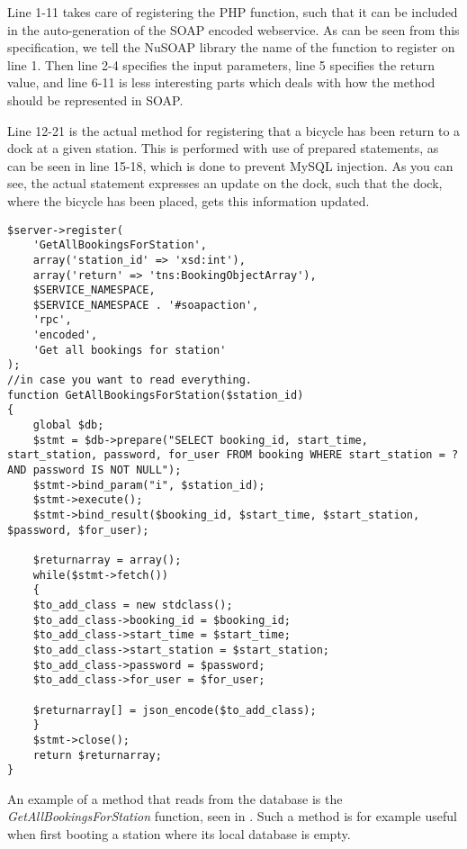 Line 1-11 takes care of registering the PHP function, such that it can be included in the auto-generation of the SOAP encoded webservice.
As can be seen from this specification, we tell the NuSOAP library the name of the function to register on line 1.
Then line 2-4 specifies the input parameters, line 5 specifies the return value, and line 6-11 is less interesting parts which deals with how the method should be represented in SOAP.

Line 12-21 is the actual method for registering that a bicycle has been return to a dock at a given station.
This is performed with use of prepared statements, as can be seen in line 15-18, which is done to prevent MySQL injection.
As you can see, the actual statement expresses an update on the dock, such that the dock, where the bicycle has been placed, gets this information updated.

\begin{minipage}{\textwidth}
\begin{lstlisting}[caption = {Method for reading all bookings for a given station}, label = {lst:getallbookingstation}]
$server->register(
	'GetAllBookingsForStation',
	array('station_id' => 'xsd:int'),
	array('return' => 'tns:BookingObjectArray'),
	$SERVICE_NAMESPACE,
	$SERVICE_NAMESPACE . '#soapaction',
	'rpc',
	'encoded',
	'Get all bookings for station'
);
//in case you want to read everything.
function GetAllBookingsForStation($station_id)
{
	global $db;
	$stmt = $db->prepare("SELECT booking_id, start_time, start_station, password, for_user FROM booking WHERE start_station = ? AND password IS NOT NULL");
	$stmt->bind_param("i", $station_id);
	$stmt->execute();
	$stmt->bind_result($booking_id, $start_time, $start_station, $password, $for_user);
	
	$returnarray = array();
	while($stmt->fetch())
	{
	$to_add_class = new stdclass();
	$to_add_class->booking_id = $booking_id;
	$to_add_class->start_time = $start_time;
	$to_add_class->start_station = $start_station;
	$to_add_class->password = $password;
	$to_add_class->for_user = $for_user;
	
	$returnarray[] = json_encode($to_add_class);
	}
	$stmt->close();
	return $returnarray;
}
\end{lstlisting}
\end{minipage}

An example of a method that reads from the database is the \textit{GetAllBookingsForStation} function, seen in .
Such a method is for example useful when first booting a station where its local database is empty.

